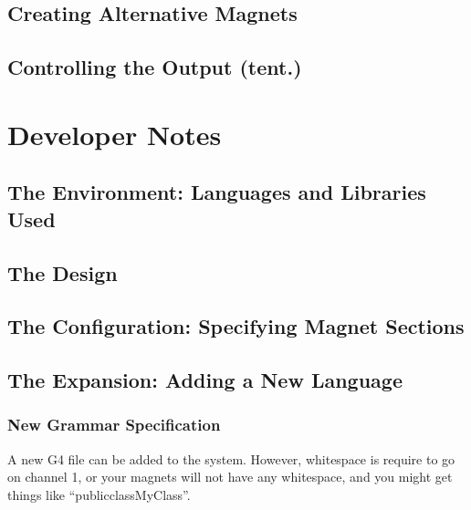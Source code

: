 \documentclass[letter,10pt]{article}
\begin{document}
\subsection{Creating Alternative Magnets}

\subsection{Controlling the Output (tent.)}



\section{Developer Notes}

\subsection{The Environment: Languages and Libraries Used}

\subsection{The Design}

\subsection{The Configuration: Specifying Magnet Sections}

\subsection{The Expansion: Adding a New Language}

\subsubsection{New Grammar Specification}
A new G4 file can be added to the system. However, whitespace is
require to go on channel 1, or your magnets will not have any
whitespace, and you might get things like ``publicclassMyClass''.
\end{document}
